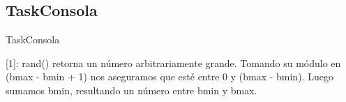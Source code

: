 \subsection{TaskConsola}

\begin{algorithm}
 \caption{TaskConsola}
 \begin{algorithmic}[1]
     \Comment{[1]}
   \EndFor
 \EndProcedure
 \end{algorithmic}
\end{algorithm}

[1]: rand() retorna un número arbitrariamente grande.
Tomando su módulo en (bmax - bmin + 1) nos aseguramos que esté entre 0 y (bmax - bmin).\newline
Luego sumamos bmin, resultando un número entre bmin y bmax.